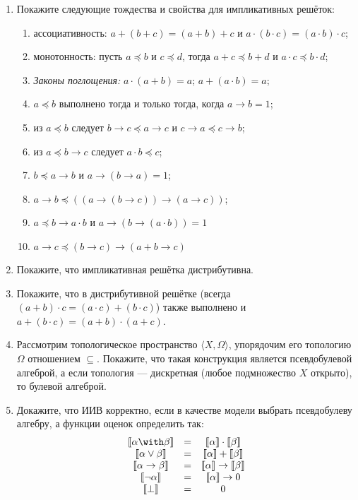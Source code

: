 \documentclass[10pt,a4paper,oneside]{article}
\begin{document}
\begin{enumerate}
\item Покажите следующие тождества и свойства для импликативных решёток:
\begin{enumerate}
\item ассоциативность: $a + (b + c) = (a + b) + c$ и $a \cdot (b \cdot c) = (a \cdot b) \cdot c$;
\item монотонность: пусть $a \preceq b$ и $c \preceq d$, тогда $a + c \preceq b + d$ и $a \cdot c \preceq b \cdot d$;
\item \emph{Законы поглощения:} $a \cdot (a + b) = a$; $a + (a \cdot b) = a$;
\item $a \preceq b$ выполнено тогда и только тогда, когда $a \rightarrow b = 1$;
\item из $a \preceq b$ следует $b\rightarrow c \preceq a\rightarrow c$ и $c\rightarrow a \preceq c \rightarrow b$;
\item из $a \preceq b \rightarrow c$ следует $a \cdot b \preceq c$;
\item $b \preceq a \rightarrow b$ и $a \rightarrow (b \rightarrow a) = 1$;
\item $a \rightarrow b \preceq ((a \rightarrow (b \rightarrow c)) \rightarrow (a \rightarrow c))$;
\item $a \preceq b \rightarrow a \cdot b$ и $a \rightarrow (b \rightarrow (a \cdot b)) = 1$
\item $a \rightarrow c \preceq (b \rightarrow c) \rightarrow (a + b \rightarrow c)$
\end{enumerate}

\item Покажите, что импликативная решётка дистрибутивна.
\item Покажите, что в дистрибутивной решётке (всегда $(a + b)\cdot c = (a \cdot c) + (b \cdot c)$) также выполнено
и $a + (b \cdot c) = (a + b) \cdot (a + c)$.

\item Рассмотрим топологическое пространство $\langle X, \Omega \rangle$, упорядочим его топологию $\Omega$ отношением $\subseteq$. 
Покажите, что такая конструкция является псевдобулевой алгеброй, а если топология --- дискретная (любое подмножество $X$ открыто),
то булевой алгеброй. 

\item Докажите, что ИИВ корректно, если в качестве модели выбрать псевдобулеву алгебру, а функции оценок определить так:
$$\begin{array}{ccc}
  \llbracket\alpha \with \beta\rrbracket & = & \llbracket\alpha\rrbracket \cdot \llbracket\beta\rrbracket \\
  \llbracket\alpha \vee \beta\rrbracket & = & \llbracket\alpha\rrbracket + \llbracket\beta\rrbracket \\
  \llbracket\alpha \rightarrow \beta\rrbracket & = & \llbracket\alpha\rrbracket \rightarrow \llbracket\beta\rrbracket \\
  \llbracket\neg\alpha\rrbracket & = & \llbracket\alpha\rrbracket \rightarrow 0 \\
  \llbracket\bot\rrbracket & = & 0 \\
\end{array}$$


\end{enumerate}
\end{document}

